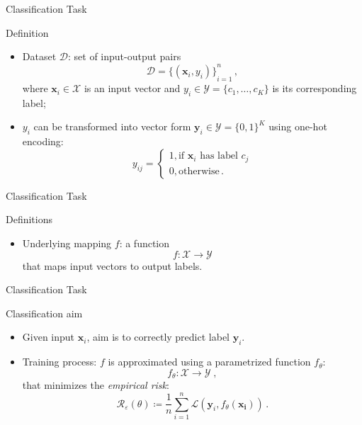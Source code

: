 \begin{frame}{Classification Task}
    \begin{definitionblock}{Definition}
        \centering
        \begin{itemize}
            \item<1-> Dataset $\mathcal{D}$: set of input-output pairs
            \[
                \mathcal{D} = {\{(\mathbf{x}_i, y_i)\}}_{i=1}^n\,,
            \]
            where $\mathbf{x}_i \in \mathcal{X}$ is an input vector and $y_i\in \mathcal{Y} = \{c_1, \dots, c_K\}$ is its corresponding label;
            \item<2-> $y_i$ can be transformed into vector form $\mathbf{y}_i\in \mathcal{Y} = {\{0,1\}}^K$ using one-hot encoding:
            \[
                y_{ij} = 
                \begin{cases}
                    1, \text{if $\mathbf{x}_i$ has label $c_j$}\\
                    0, \text{otherwise}\,.
                \end{cases}
            \]
        \end{itemize}
    \end{definitionblock}
\end{frame}

\begin{frame}{Classification Task}
    \begin{definitionblock}{Definitions}
        \centering
        \begin{itemize}
            \item<1-> Underlying mapping $f$: a function
            \[
                f:\mathcal{X} \to \mathcal{Y}
            \]
            that maps input vectors to output labels.
        \end{itemize}
    \end{definitionblock}
\end{frame}

\begin{frame}{Classification Task}
    \begin{normalblock}{Classification aim}
        \centering
        \begin{itemize}
            \item<1-> Given input $\mathbf{x}_i$, aim is to correctly predict label $\mathbf{y}_i$.
            \item<2-> Training process: $f$ is approximated using a parametrized function $f_{\theta}$:
            \[
                f_{\theta}: \mathcal{X} \to \mathcal{Y}\;,
            \]
            that minimizes the \emph{empirical risk}: 
            \[
                \mathcal{R}_{\varepsilon}(\theta) \coloneqq \frac{1}{n}\sum_{i=1}^{n} \mathcal{L}(\mathbf{y}_i,f_{\theta}(\mathbf{x_i}))\,.
            \]
        \end{itemize}
    \end{normalblock}
\end{frame}

